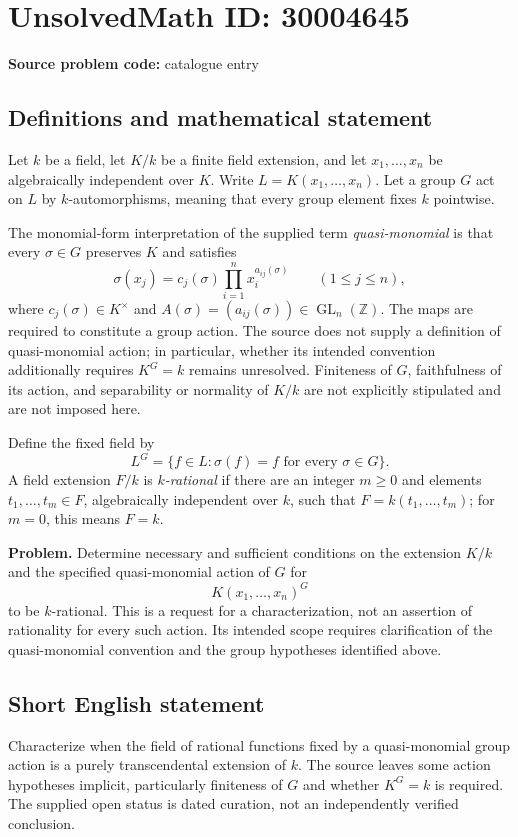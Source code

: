 \documentclass[11pt]{article}
\newcommand{\Z}{\mathbb{Z}}
\begin{document}
\section*{UnsolvedMath ID: 30004645}
\textbf{Source problem code:} catalogue entry
\subsection{Definitions and mathematical statement}
Let \(k\) be a field, let \(K/k\) be a finite field extension, and let \(x_1,\ldots,x_n\) be algebraically independent over \(K\). Write \(L=K(x_1,\ldots,x_n)\). Let a group \(G\) act on \(L\) by \(k\)-automorphisms, meaning that every group element fixes \(k\) pointwise.

The monomial-form interpretation of the supplied term \emph{quasi-monomial} is that every \(\sigma\in G\) preserves \(K\) and satisfies
\[
\sigma(x_j)=c_j(\sigma)\prod_{i=1}^{n}x_i^{a_{ij}(\sigma)}\qquad(1\leq j\leq n),
\]
where \(c_j(\sigma)\in K^{\times}\) and \(A(\sigma)=(a_{ij}(\sigma))\in\operatorname{GL}_n(\Z)\). The maps are required to constitute a group action. The source does not supply a definition of quasi-monomial action; in particular, whether its intended convention additionally requires \(K^G=k\) remains unresolved. Finiteness of \(G\), faithfulness of its action, and separability or normality of \(K/k\) are not explicitly stipulated and are not imposed here.

Define the fixed field by
\[
L^G=\{f\in L:\sigma(f)=f\text{ for every }\sigma\in G\}.
\]
A field extension \(F/k\) is \emph{\(k\)-rational} if there are an integer \(m\geq0\) and elements \(t_1,\ldots,t_m\in F\), algebraically independent over \(k\), such that \(F=k(t_1,\ldots,t_m)\); for \(m=0\), this means \(F=k\).

\textbf{Problem.} Determine necessary and sufficient conditions on the extension \(K/k\) and the specified quasi-monomial action of \(G\) for
\[
K(x_1,\ldots,x_n)^G
\]
to be \(k\)-rational. This is a request for a characterization, not an assertion of rationality for every such action. Its intended scope requires clarification of the quasi-monomial convention and the group hypotheses identified above.
\subsection{Short English statement}
Characterize when the field of rational functions fixed by a quasi-monomial group action is a purely transcendental extension of \(k\). The source leaves some action hypotheses implicit, particularly finiteness of \(G\) and whether \(K^G=k\) is required. The supplied open status is dated curation, not an independently verified conclusion.
\end{document}
